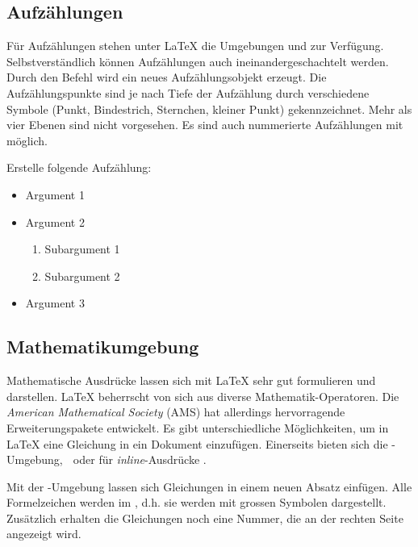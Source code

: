 \subsection{Aufzählungen}
Für Aufzählungen stehen unter \LaTeX{} die Umgebungen  und  zur Verfügung. Selbstverständlich können Aufzählungen auch ineinandergeschachtelt werden.
Durch den Befehl  wird ein neues Aufzählungsobjekt erzeugt. Die Aufzählungspunkte sind je nach Tiefe der Aufzählung durch verschiedene Symbole (Punkt, Bindestrich, Sternchen, kleiner Punkt) gekennzeichnet. Mehr als vier Ebenen sind nicht vorgesehen.
Es sind auch nummerierte Aufzählungen mit  möglich. 
$ $
\begin{aufgabe}
	Erstelle folgende Aufzählung:
	\begin{itemize}	
		\item Argument 1
		\item Argument 2
		\begin{enumerate}
			\item Subargument 1
			\item Subargument 2
		\end{enumerate}
		\item Argument 3
	\end{itemize}
\end{aufgabe}

\subsection{Mathematikumgebung}
Mathematische Ausdrücke lassen sich mit \LaTeX$ $ sehr gut formulieren und darstellen. \LaTeX$ $ beherrscht von sich aus diverse Mathematik-Operatoren. Die \textit{American Mathematical Society} (AMS) hat allerdings hervorragende Erweiterungspakete entwickelt.
Es gibt unterschiedliche Möglichkeiten, um in \LaTeX $ $ eine Gleichung in ein Dokument einzufügen. Einerseits bieten sich die -Umgebung, \befehl{[}$\; $\befehl{]} oder für \textit{inline}-Ausdrücke \umgebung{\$ \$}.\vspace{6pt}

Mit der -Umgebung lassen sich Gleichungen in einem neuen Absatz einfügen. Alle Formelzeichen werden im , d.h. sie werden mit grossen Symbolen dargestellt. Zusätzlich erhalten die Gleichungen noch eine Nummer, die an der rechten Seite angezeigt wird.

